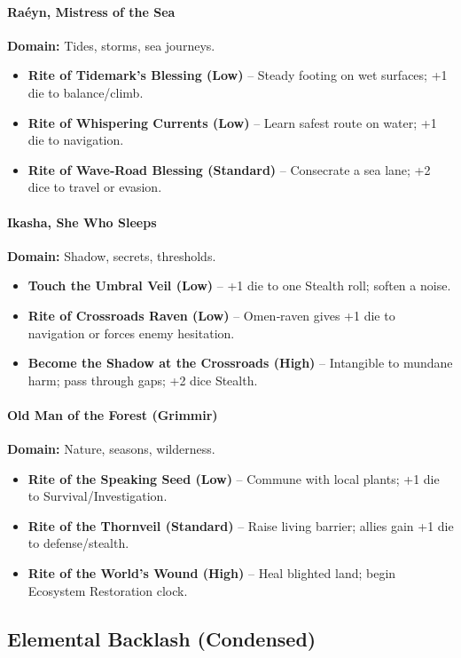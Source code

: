 \paragraph*{Raéyn, Mistress of the Sea}
\textbf{Domain:} Tides, storms, sea journeys.
\begin{itemize}
  \item \textbf{Rite of Tidemark's Blessing (Low)} -- Steady footing on wet surfaces; +1 die to balance/climb.
  \item \textbf{Rite of Whispering Currents (Low)} -- Learn safest route on water; +1 die to navigation.
  \item \textbf{Rite of Wave‑Road Blessing (Standard)} -- Consecrate a sea lane; +2 dice to travel or evasion.
\end{itemize}

\paragraph*{Ikasha, She Who Sleeps}
\textbf{Domain:} Shadow, secrets, thresholds.
\begin{itemize}
  \item \textbf{Touch the Umbral Veil (Low)} -- +1 die to one Stealth roll; soften a noise.
  \item \textbf{Rite of Crossroads Raven (Low)} -- Omen‑raven gives +1 die to navigation or forces enemy hesitation.
  \item \textbf{Become the Shadow at the Crossroads (High)} -- Intangible to mundane harm; pass through gaps; +2 dice Stealth.
\end{itemize}

\paragraph*{Old Man of the Forest (Grimmir)}
\textbf{Domain:} Nature, seasons, wilderness.
\begin{itemize}
  \item \textbf{Rite of the Speaking Seed (Low)} -- Commune with local plants; +1 die to Survival/Investigation.
  \item \textbf{Rite of the Thornveil (Standard)} -- Raise living barrier; allies gain +1 die to defense/stealth.
  \item \textbf{Rite of the World's Wound (High)} -- Heal blighted land; begin Ecosystem Restoration clock.
\end{itemize}

\subsection{Elemental Backlash (Condensed)}

